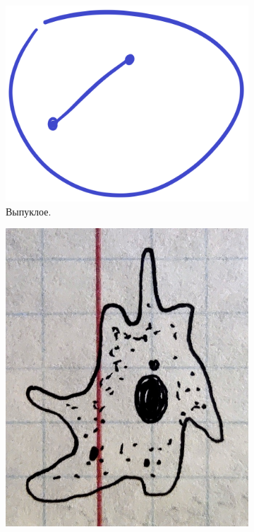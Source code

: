 \documentclass[a4paper,12pt]{article}
\begin{document}
  \begin{figure}[ht]
    \centering
    
    \begin{subfigure}[b]{0.3\textwidth}
      \centering
    
      \includegraphics[width=\columnwidth]{convex-example}
    
      \caption{Выпуклое.}
    \end{subfigure}
    \hspace{2em}
    \begin{subfigure}[b]{0.3\textwidth}
      
      \centering
      \includegraphics[width=\columnwidth]{ameba_c10_lvl200}
  

\end{subfigure}
\end{figure}
\end{document}
